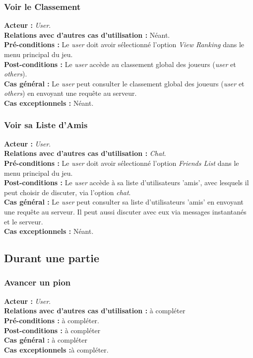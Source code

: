 \documentclass[10pt, a4paper]{article}
\begin{document}
\subsubsection{Voir le Classement}
\textbf{Acteur :} \textit{User}.\\
\textbf{Relations avec d'autres cas d'utilisation :} Néant.\\
\textbf{Pré-conditions :} Le \textit{user} doit avoir sélectionné l'option \textit{View Ranking} dans le menu principal du jeu.\\
\textbf{Post-conditions :} Le \textit{user} accède au classement global des joueurs (\textit{user} et \textit{others}).\\
\textbf{Cas général :} Le \textit{user} peut consulter le classement global des joueurs (\textit{user} et \textit{others}) en envoyant une requête au serveur.\\
\textbf{Cas exceptionnels :} Néant.

\subsubsection{Voir sa Liste d'Amis}
\textbf{Acteur :} \textit{User}.\\
\textbf{Relations avec d'autres cas d'utilisation :} \textit{Chat}.\\
\textbf{Pré-conditions :} Le \textit{user} doit avoir sélectionné l'option \textit{Friends List} dans le menu principal du jeu.\\
\textbf{Post-conditions :} Le \textit{user} accède à sa liste d'utilisateurs 'amis', avec lesquels il peut choisir de discuter, via l'option \textit{chat}.\\
\textbf{Cas général :} Le \textit{user} peut consulter sa liste d'utilisateurs 'amis' en envoyant une requête au serveur. Il peut aussi discuter avec eux via messages instantanés et le serveur.\\
\textbf{Cas exceptionnels :} Néant.
		

\subsection{Durant une partie}

\subsubsection{Avancer un pion}
\textbf{Acteur :} \textit{User}.\\
\textbf{Relations avec d'autres cas d'utilisation :} à compléter\\
\textbf{Pré-conditions :} à compléter.\\
\textbf{Post-conditions :} à compléter\\
\textbf{Cas général :} à compléter\\
\textbf{Cas exceptionnels :}à compléter.
\end{document}
